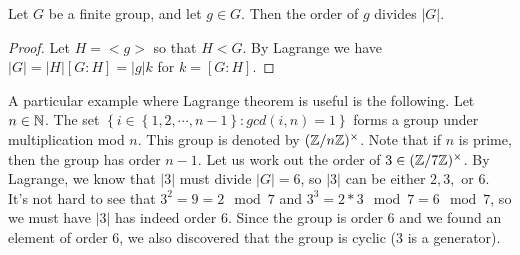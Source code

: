 \begin{corollary}
  Let $G$ be a finite group, and let $g\in G$. Then the order of $g$ divides $|G|$.
  \label{lagrangeConsequence}
\end{corollary}
\begin{proof}
  Let $H=<g>$ so that $H<G$. By Lagrange we have $|G|=|H|[G:H]=|g|k$ for $k=[G:H]$.
\end{proof}

\begin{example}
  A particular example where Lagrange theorem is useful is the following. Let
  $n\in\mathbb N$. The set $\left\{ i\in \left\{ 1,2,\cdots,n-1 \right\} : gcd(i,n)=1 \right\}$
  forms a group under multiplication mod $n$. This group is denoted by
  $(\mathbb Z/n\mathbb Z)^{\times}$. Note that if $n$ is prime, then the group has order $n-1$. Let us
  work out the order of $3\in (\mathbb Z/7\mathbb Z)^{\times}$. By Lagrange, we know that $|3|$ must
  divide $|G|=6$, so $|3|$ can be either $2,3,$ or $6$. It's not hard to see that
  $3^2=9=2\mod 7$ and $3^3=2*3\mod 7=6\mod 7$, so we must have $|3|$ has indeed order $6$. Since the group
  is order $6$ and we found an element of order $6$, we also discovered that the group is
  cyclic ($3$ is a generator).
\end{example}
